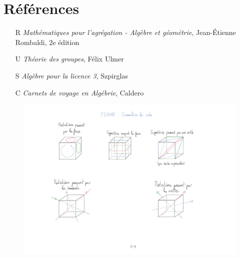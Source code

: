 \documentclass[10pt, a4paper, parskip=full, twoside, twocolumn]{report}
\begin{document}
\section*{Références}
\begin{itemize}
	\item[R] \emph{Mathématiques pour l'agrégation - Algèbre et géométrie}, Jean-Étienne Rombaldi, 2e édition
	\item[U] \emph{Théorie des groupes}, Félix Ulmer
	\item[S] \emph{Algèbre pour la licence 3}, Szpirglas
	\item[C] \emph{Carnets de voyage en Algébrie}, Caldero
\end{itemize}

\begin{figure}[!htb]
	\centering
	\includegraphics[trim={0 0 0 0},clip,width=1\linewidth]{img/101.pdf}
\end{figure}
\end{document}
